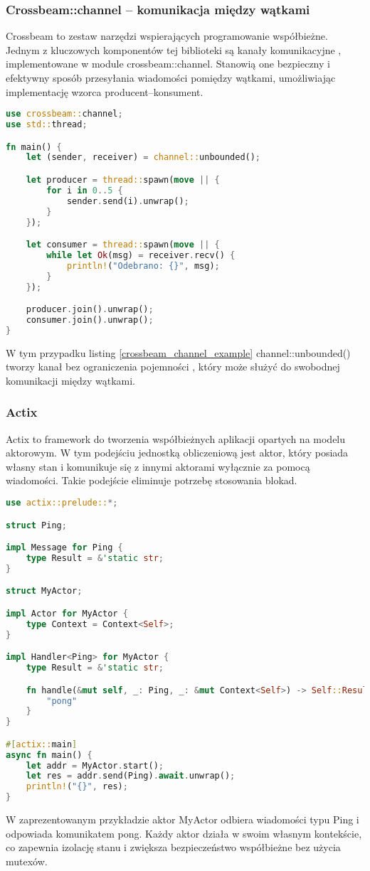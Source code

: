 \subsubsection{Crossbeam::channel – komunikacja między wątkami}
Crossbeam to zestaw narzędzi wspierających programowanie współbieżne. Jednym z kluczowych komponentów tej biblioteki są kanały komunikacyjne , implementowane w module crossbeam::channel. Stanowią one bezpieczny i efektywny sposób przesyłania wiadomości pomiędzy wątkami, umożliwiając implementację wzorca producent–konsument.

\begin{lstlisting}[language=Rust, caption=Przykład użycia kanałów Crossbeam, label=crossbeam_channel_example]
use crossbeam::channel;
use std::thread;

fn main() {
    let (sender, receiver) = channel::unbounded();

    let producer = thread::spawn(move || {
        for i in 0..5 {
            sender.send(i).unwrap();
        }
    });

    let consumer = thread::spawn(move || {
        while let Ok(msg) = receiver.recv() {
            println!("Odebrano: {}", msg);
        }
    });

    producer.join().unwrap();
    consumer.join().unwrap();
}
\end{lstlisting}
W tym przypadku listing \ref{crossbeam_channel_example} channel::unbounded() tworzy kanał bez ograniczenia pojemności , który może służyć do swobodnej komunikacji między wątkami.
\subsubsection{Actix}
Actix to framework do tworzenia współbieżnych aplikacji opartych na modelu aktorowym. W tym podejściu jednostką obliczeniową jest aktor, który posiada własny stan i komunikuje się z innymi aktorami wyłącznie za pomocą wiadomości. Takie podejście eliminuje potrzebę stosowania blokad.
\begin{lstlisting}[language=Rust, caption=Przykład użycia Actix, label=actix_example]
use actix::prelude::*;

struct Ping;

impl Message for Ping {
    type Result = &'static str;
}

struct MyActor;

impl Actor for MyActor {
    type Context = Context<Self>;
}

impl Handler<Ping> for MyActor {
    type Result = &'static str;

    fn handle(&mut self, _: Ping, _: &mut Context<Self>) -> Self::Result {
        "pong"
    }
}

#[actix::main]
async fn main() {
    let addr = MyActor.start();
    let res = addr.send(Ping).await.unwrap();
    println!("{}", res);
}
\end{lstlisting}
W zaprezentowanym przykładzie aktor MyActor odbiera wiadomości typu Ping i odpowiada komunikatem pong. Każdy aktor działa w swoim własnym kontekście, co zapewnia izolację stanu i zwiększa bezpieczeństwo współbieżne bez użycia mutexów.

